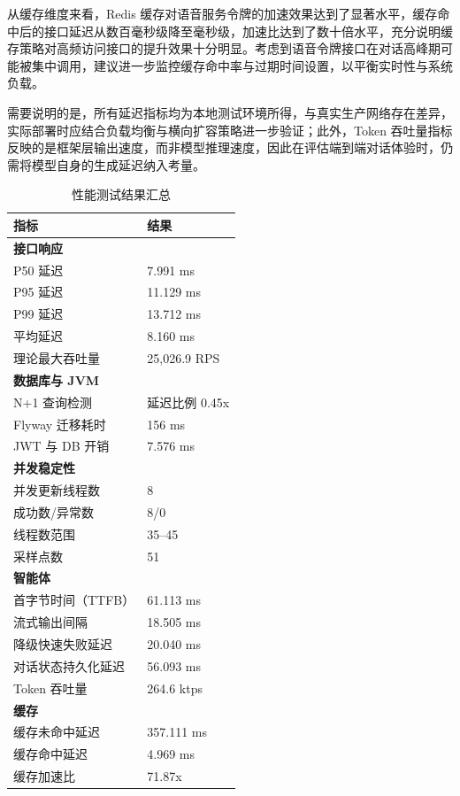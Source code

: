 \par 从缓存维度来看，Redis 缓存对语音服务令牌的加速效果达到了显著水平，缓存命中后的接口延迟从数百毫秒级降至毫秒级，加速比达到了数十倍水平，充分说明缓存策略对高频访问接口的提升效果十分明显。考虑到语音令牌接口在对话高峰期可能被集中调用，建议进一步监控缓存命中率与过期时间设置，以平衡实时性与系统负载。

\par 需要说明的是，所有延迟指标均为本地测试环境所得，与真实生产网络存在差异，实际部署时应结合负载均衡与横向扩容策略进一步验证；此外，Token 吞吐量指标反映的是框架层输出速度，而非模型推理速度，因此在评估端到端对话体验时，仍需将模型自身的生成延迟纳入考量。

\begin{table}[htbp]
  \centering
  \caption{性能测试结果汇总}
  \label{tab:perf-summary}
  \begin{tabular}{p{4cm}p{4cm}}
    \hline
    指标 & 结果 \\
    \hline
    \multicolumn{2}{l}{\textbf{接口响应}} \\
    P50 延迟 & 7.991 ms \\
    P95 延迟 & 11.129 ms \\
    P99 延迟 & 13.712 ms \\
    平均延迟 & 8.160 ms \\
    理论最大吞吐量 & 25,026.9 RPS \\
    \hline
    \multicolumn{2}{l}{\textbf{数据库与 JVM}} \\
    N+1 查询检测 & 延迟比例 0.45x \\
    Flyway 迁移耗时 & 156 ms \\
    JWT 与 DB 开销 & 7.576 ms \\
    \hline
    \multicolumn{2}{l}{\textbf{并发稳定性}} \\
    并发更新线程数 & 8 \\
    成功数/异常数 & 8/0 \\
    线程数范围 & 35--45 \\
    采样点数 & 51 \\
    \hline
    \multicolumn{2}{l}{\textbf{智能体}} \\
    首字节时间（TTFB） & 61.113 ms \\
    流式输出间隔 & 18.505 ms \\
    降级快速失败延迟 & 20.040 ms \\
    对话状态持久化延迟 & 56.093 ms \\
    Token 吞吐量 & 264.6 ktps \\
    \hline
    \multicolumn{2}{l}{\textbf{缓存}} \\
    缓存未命中延迟 & 357.111 ms \\
    缓存命中延迟 & 4.969 ms \\
    缓存加速比 & 71.87x \\
    \hline
  \end{tabular}
\end{table}

